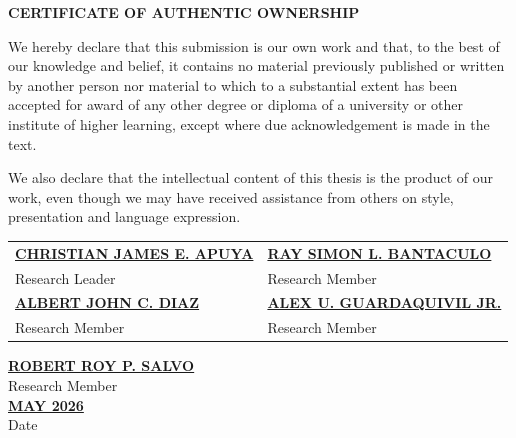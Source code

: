 {\baselineskip
	
	\begin{center}
		{\bf CERTIFICATE OF AUTHENTIC OWNERSHIP}\\[24pt]
	\end{center}
	
	We hereby declare that this submission is our own work and that, to the best of our knowledge and belief, it contains no material previously published or written by another person nor material to which to a substantial extent has been accepted for award of any other degree or diploma of a university or other institute of higher learning, except where due acknowledgement is made in the text.
	
	We also declare that the intellectual content of this thesis is the product of our work, even though we may have received assistance from others on style, presentation and language expression.
	
	\vspace{40pt}
	
	\noindent
	\begin{tabular}{p{} p{}}
		\underline{\textbf{CHRISTIAN JAMES E. APUYA}} & \underline{\textbf{RAY SIMON L. BANTACULO}} \\
		Research Leader & Research Member \\[30pt]
		\underline{\textbf{ALBERT JOHN C. DIAZ}} & \underline{\textbf{ALEX U. GUARDAQUIVIL JR.}} \\
		Research Member & Research Member \\[30pt]
	\end{tabular}
	
	\vspace{10pt}
	
	\begin{center}
		\underline{\textbf{ROBERT ROY P. SALVO}} \\
		Research Member \\[30pt]
		\underline{\textbf{MAY 2026}} \\
		Date
	\end{center}
	
}